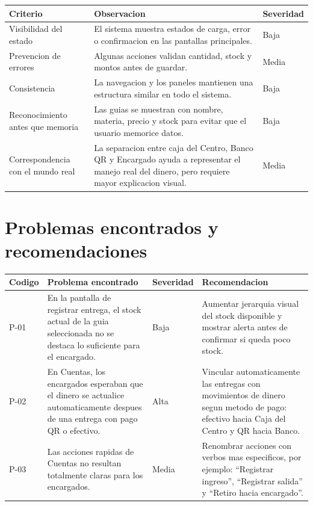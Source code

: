 \documentclass[12pt,letterpaper]{article}
\begin{document}
\begin{center}
\begin{tabularx}{\textwidth}{|B{4cm}|Y|B{2.5cm}|}
\hline
Criterio & Observacion & Severidad \\
\hline
Visibilidad del estado & El sistema muestra estados de carga, error o confirmacion en las pantallas principales. & Baja \\
\hline
Prevencion de errores & Algunas acciones validan cantidad, stock y montos antes de guardar. & Media \\
\hline
Consistencia & La navegacion y los paneles mantienen una estructura similar en todo el sistema. & Baja \\
\hline
Reconocimiento antes que memoria & Las guias se muestran con nombre, materia, precio y stock para evitar que el usuario memorice datos. & Baja \\
\hline
Correspondencia con el mundo real & La separacion entre caja del Centro, Banco QR y Encargado ayuda a representar el manejo real del dinero, pero requiere mayor explicacion visual. & Media \\
\hline
\end{tabularx}
\end{center}

\section{Problemas encontrados y recomendaciones}

\begin{center}
\begin{tabularx}{\textwidth}{|B{1.5cm}|Y|B{2.3cm}|Y|}
\hline
Codigo & Problema encontrado & Severidad & Recomendacion \\
\hline
P-01 & En la pantalla de registrar entrega, el stock actual de la guia seleccionada no se destaca lo suficiente para el encargado. & Baja & Aumentar jerarquia visual del stock disponible y mostrar alerta antes de confirmar si queda poco stock. \\
\hline
P-02 & En Cuentas, los encargados esperaban que el dinero se actualice automaticamente despues de una entrega con pago QR o efectivo. & Alta & Vincular automaticamente las entregas con movimientos de dinero segun metodo de pago: efectivo hacia Caja del Centro y QR hacia Banco. \\
\hline
P-03 & Las acciones rapidas de Cuentas no resultan totalmente claras para los encargados. & Media & Renombrar acciones con verbos mas especificos, por ejemplo: ``Registrar ingreso'', ``Registrar salida'' y ``Retiro hacia encargado''. \\
\hline
\end{tabularx}
\end{center}
\end{document}
